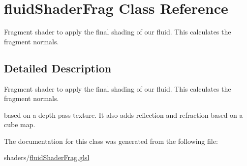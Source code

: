 \hypertarget{classfluid_shader_frag}{\section{fluid\-Shader\-Frag Class Reference}
\label{classfluid_shader_frag}
}


Fragment shader to apply the final shading of our fluid. This calculates the fragment normals.  




\subsection{Detailed Description}
Fragment shader to apply the final shading of our fluid. This calculates the fragment normals. 

based on a depth pass texture. It also adds reflection and refraction based on a cube map. 

The documentation for this class was generated from the following file\-:\begin{DoxyCompactItemize}
\item 
shaders/\hyperlink{fluid_shader_frag_8glsl}{fluid\-Shader\-Frag.\-glsl}\end{DoxyCompactItemize}
